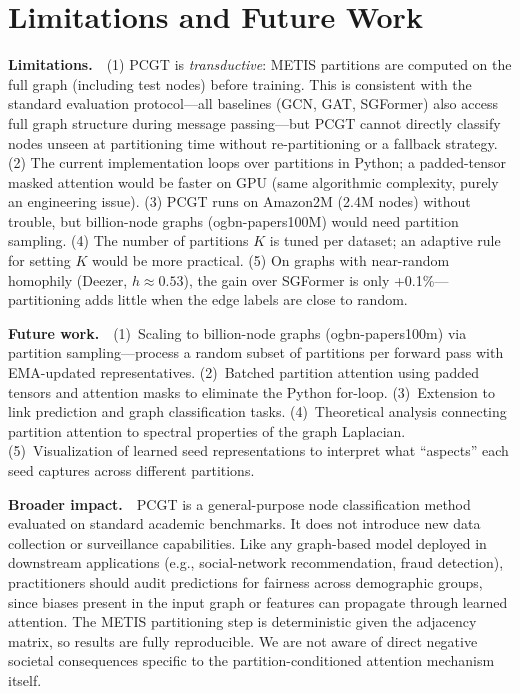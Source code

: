\section{Limitations and Future Work}

\textbf{Limitations.}~~(1) PCGT is \emph{transductive}: METIS partitions are computed on the full graph (including test nodes) before training. This is consistent with the standard evaluation protocol---all baselines (GCN, GAT, SGFormer) also access full graph structure during message passing---but PCGT cannot directly classify nodes unseen at partitioning time without re-partitioning or a fallback strategy. (2) The current implementation loops over partitions in Python; a padded-tensor masked attention would be faster on GPU (same algorithmic complexity, purely an engineering issue). (3) PCGT runs on Amazon2M (2.4M nodes) without trouble, but billion-node graphs (ogbn-papers100M) would need partition sampling. (4) The number of partitions $K$ is tuned per dataset; an adaptive rule for setting $K$ would be more practical. (5) On graphs with near-random homophily (Deezer, $h \approx 0.53$), the gain over SGFormer is only +0.1\%---partitioning adds little when the edge labels are close to random.

\textbf{Future work.}~~(1)~Scaling to billion-node graphs (ogbn-papers100m) via partition sampling---process a random subset of partitions per forward pass with EMA-updated representatives. (2)~Batched partition attention using padded tensors and attention masks to eliminate the Python for-loop. (3)~Extension to link prediction and graph classification tasks. (4)~Theoretical analysis connecting partition attention to spectral properties of the graph Laplacian. (5)~Visualization of learned seed representations to interpret what ``aspects'' each seed captures across different partitions.

\textbf{Broader impact.}~~PCGT is a general-purpose node classification method evaluated on standard academic benchmarks.  It does not introduce new data collection or surveillance capabilities.  Like any graph-based model deployed in downstream applications (e.g., social-network recommendation, fraud detection), practitioners should audit predictions for fairness across demographic groups, since biases present in the input graph or features can propagate through learned attention.  The METIS partitioning step is deterministic given the adjacency matrix, so results are fully reproducible.  We are not aware of direct negative societal consequences specific to the partition-conditioned attention mechanism itself.

